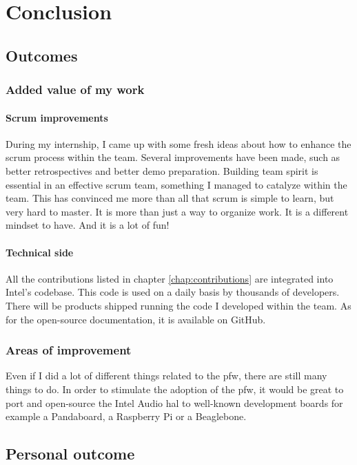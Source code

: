 \chapter{Conclusion}

\section{Outcomes}

\subsection{Added value of my work}
\subsubsection{Scrum improvements}
During my internship, I came up with some fresh ideas about how to enhance the \gls{scrum} process within the team.
Several improvements have been made, such as better retrospectives and better demo preparation.
Building team spirit is essential in an effective \gls{scrum} team, something I managed to catalyze within the team.
This has convinced me more than all that \gls{scrum} is simple to learn, but very hard to master.
It is more than just a way to organize work. It is a different mindset to have. And it is a lot of fun!

\subsubsection{Technical side}
All the contributions listed in chapter \ref{chap:contributions} are integrated into Intel's codebase.
This code is used on a daily basis by thousands of developers. There will be products shipped running the
code I developed within the team.
As for the open-source documentation, it is available on \gls{GitHub}.

\subsection{Areas of improvement}
Even if I did a lot of different things related to the \gls{pfw}, there are still many things to do.
In order to stimulate the adoption of the \gls{pfw}, it would be great to
port and open-source the Intel Audio \gls{hal} to well-known development boards for example a
Pandaboard, a Raspberry Pi or a Beaglebone.


\section{Personal outcome}

